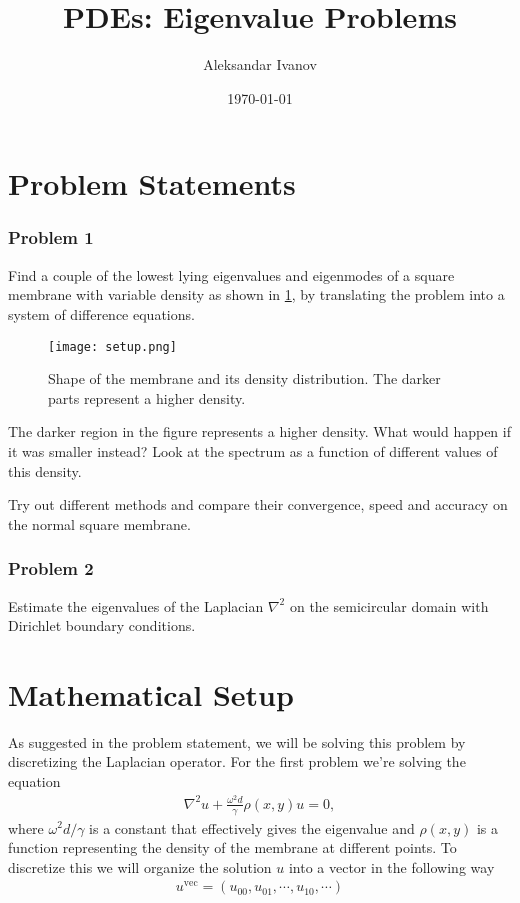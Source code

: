 \documentclass[10pt,a4paper,twocolumn]{article}
\begin{document}
\title{PDEs: Eigenvalue Problems}
\author{Aleksandar Ivanov}
\date{\today}
\maketitle

\section{Problem Statements}

\subsubsection*{Problem 1}
 
Find a couple of the lowest lying eigenvalues and eigenmodes of a square membrane with variable density as shown in \cref{fig:setup}, by translating the problem into a system of difference equations.

\begin{figure}[!h]
    \centering
    \texttt{[image: setup.png]}
    \caption{Shape of the membrane and its density distribution. The darker parts represent a higher density.}
    \label{fig:setup}
\end{figure}

The darker region in the figure represents a higher density. What would happen if it was smaller instead? Look at the spectrum as a function of different values of this density.

Try out different methods and compare their convergence, speed and accuracy on the normal square membrane.

\subsubsection*{Problem 2}

Estimate the eigenvalues of the Laplacian $\nabla^2$ on the semicircular domain with Dirichlet boundary conditions.

\section{Mathematical Setup}

As suggested in the problem statement, we will be solving this problem by discretizing the Laplacian operator. For the first problem we're solving the equation
%
\begin{align}
    \nabla^2 u + \frac{\omega^2 d}{\gamma} \rho(x,y) u = 0,
\end{align}
%
where $\omega^2 d / \gamma$ is a constant that effectively gives the eigenvalue and $\rho(x,y)$ is a function representing the density of the membrane at different points. To discretize this we will organize the solution $u$ into a vector in the following way
%
\begin{align}
    u^{\mathrm{vec}} = (u_{00}, u_{01}, \cdots, u_{10}, \cdots)
\end{align}
\end{document}
